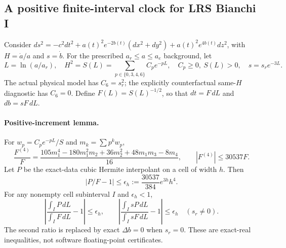 \subsection{A positive finite-interval clock for LRS Bianchi I}
\label{sec:rec-r9-finite-clock}
Consider $ds^2=-c^2dt^2+a(t)^2e^{-2b(t)}(dx^2+dy^2)
+a(t)^2e^{4b(t)}dz^2$, with $H=\dot a/a$ and $s=\dot b$.
For the prescribed $a_r\le a\le a_e$ background, let
\begin{equation}\label{eq:rec-r9-background}
 L=\ln(a/a_r),\quad H^2=S(L)=\sum_{p\in\{0,3,4,6\}}C_p e^{-pL},
 \quad C_p\ge0,\ S(L)>0,\quad s=s_re^{-3L}.
\end{equation}
The actual physical model has $C_6=s_r^2$; the explicitly
counterfactual same-$H$ diagnostic has $C_6=0$. Define
$F(L)=S(L)^{-1/2}$, so that $dt=F\,dL$ and $db=sF\,dL$.

\paragraph{Positive-increment lemma.}
For $w_p=C_pe^{-pL}/S$ and $m_k=\sum p^kw_p$,
\begin{equation}\label{eq:rec-r9-fourth}
\frac{F^{(4)}}F=\frac{105m_1^4-180m_1^2m_2+36m_2^2
+48m_1m_3-8m_4}{16},\qquad |F^{(4)}|\le30537F.
\end{equation}
Let $P$ be the exact-data cubic Hermite interpolant on a cell
of width $h$. Then
\begin{equation}\label{eq:rec-r9-bound}
 |P/F-1|\le \epsilon_h:=\frac{30537}{384}e^{3h}h^4.
\end{equation}
For any nonempty cell subinterval $I$ and $\epsilon_h<1$,
\begin{equation}\label{eq:rec-r9-integral-bound}
\left|\frac{\int_I P\,dL}{\int_I F\,dL}-1\right|\le\epsilon_h,
\qquad\left|\frac{\int_I sP\,dL}{\int_I sF\,dL}-1\right|\le\epsilon_h
\quad (s_r\ne0).
\end{equation}
The second ratio is replaced by exact $\Delta b=0$ when $s_r=0$.
These are exact-real inequalities, not software floating-point certificates.

